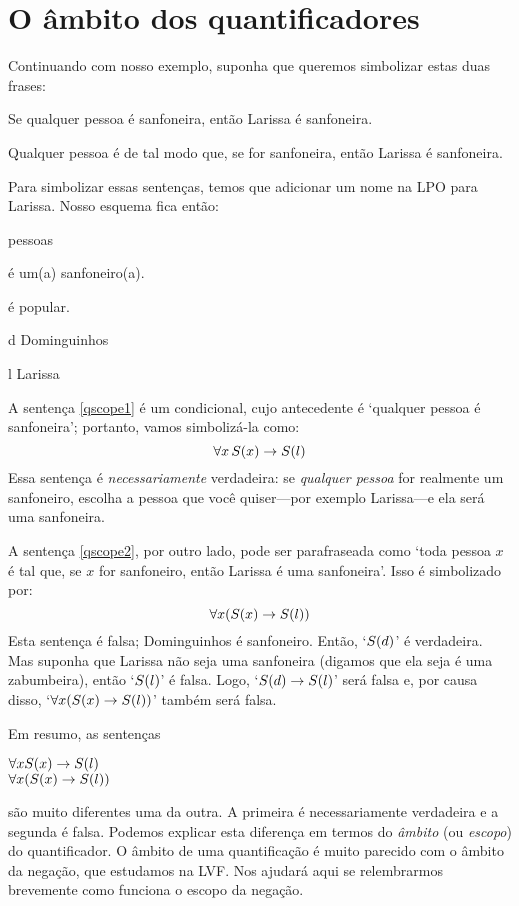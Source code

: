 \section{O âmbito dos quantificadores}
Continuando com nosso exemplo, suponha que queremos simbolizar estas duas frases:
	\begin{earg}
		\item[\ex{qscope1}] Se qualquer pessoa é sanfoneira, então Larissa é sanfoneira.
		\item[\ex{qscope2}] Qualquer pessoa é de tal modo que, se for sanfoneira, então Larissa é  sanfoneira.
	\end{earg}
Para simbolizar essas sentenças, temos que adicionar um nome na LPO para Larissa.
Nosso esquema fica então:
	\begin{center}
	\begin{ekey}
		\item[\text{domínio}] pessoas
		\item[\atom{S}{x}]  é um(a) sanfoneiro(a).
		\item[\atom{P}{x}]  é popular.
		\item[d] Dominguinhos
		\item[l] Larissa
	\end{ekey}
	\end{center}
A sentença \ref{qscope1} é um condicional, cujo antecedente é `qualquer pessoa é sanfoneira'; portanto, vamos simbolizá-la como:
$$\forall x\, \mathord{S}(x) \rightarrow \mathord{S}(l)$$
Essa sentença é \emph{necessariamente} verdadeira:
se \emph{qualquer pessoa} for realmente um sanfoneiro, escolha a pessoa que você quiser---por exemplo Larissa---e ela será uma sanfoneira.

A sentença \ref{qscope2}, por outro lado, pode ser parafraseada como `toda pessoa $x$ é tal que, se $x$ for sanfoneiro, então Larissa é uma sanfoneira'. Isso é simbolizado por:
$$\forall x (\mathord{S}(x) \rightarrow \mathord{S}(l))$$
Esta sentença é falsa; Dominguinhos é sanfoneiro.
Então, `$\mathord{S}(d)$' é verdadeira. 
Mas suponha que Larissa não seja uma sanfoneira (digamos que ela seja é uma zabumbeira), então `$\mathord{S}(l)$' é falsa.
Logo, `$\mathord{S}(d) \rightarrow \mathord{S}(l)$' será falsa e, por causa disso, \mbox{`$\forall x (\mathord{S}(x) \rightarrow \mathord{S}(l))$'} também será falsa.

Em resumo, as sentenças
\begin{center}
	$\forall x \mathord{S}(x) \rightarrow \mathord{S}(l)$ \\ $\forall x (\mathord{S}(x) \rightarrow \mathord{S}(l))$
\end{center} 
são muito diferentes uma da outra.
A primeira é necessariamente verdadeira e a segunda é falsa.
Podemos explicar esta diferença em termos do \emph{âmbito} (ou \emph{escopo}) do quantificador.
O âmbito de uma quantificação é muito parecido com o âmbito da negação, que estudamos na LVF.
Nos ajudará aqui se relembrarmos brevemente como funciona o escopo da negação.

